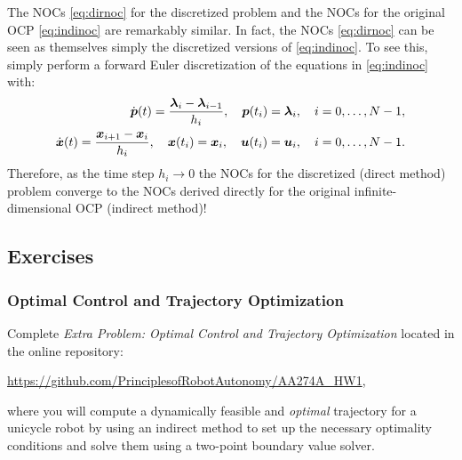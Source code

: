 The NOCs \eqref{eq:dirnoc} for the discretized problem and the NOCs for the original OCP \eqref{eq:indinoc} are remarkably similar. In fact, the NOCs \eqref{eq:dirnoc} can be seen as themselves simply the discretized versions of \eqref{eq:indinoc}. To see this, simply perform a forward Euler discretization of the equations in \eqref{eq:indinoc} with:
\begin{equation*}
\begin{split}
\dot{\bm{p}}(t) = \frac{\bm{\lambda}_{i} - \bm{\lambda}_{i-1}}{h_i}, \quad \bm{p}(t_i) = \bm{\lambda}_i, \quad i = 0, \dots, N-1, \\
\dot{\bm{x}}(t) = \frac{\bm{x}_{i+1} - \bm{x}_{i}}{h_i}, \quad \bm{x}(t_i) = \bm{x}_i, \quad \bm{u}(t_i) = \bm{u}_i, \quad i = 0, \dots, N-1.
\end{split}
\end{equation*}
Therefore, as the time step $h_i \xrightarrow{} 0$ the NOCs for the discretized (direct method) problem converge to the NOCs derived directly for the original infinite-dimensional OCP (indirect method)!

\subsection{Exercises}
\subsubsection{Optimal Control and Trajectory Optimization}
Complete \textit{Extra Problem:  Optimal Control and Trajectory Optimization} located in the online repository:

\vspace{\baselineskip}

\url{https://github.com/PrinciplesofRobotAutonomy/AA274A_HW1},

\vspace{\baselineskip}

where you will compute a dynamically feasible and \textit{optimal} trajectory for a unicycle robot by using an indirect method to set up the necessary optimality conditions and solve them using a two-point boundary value solver.